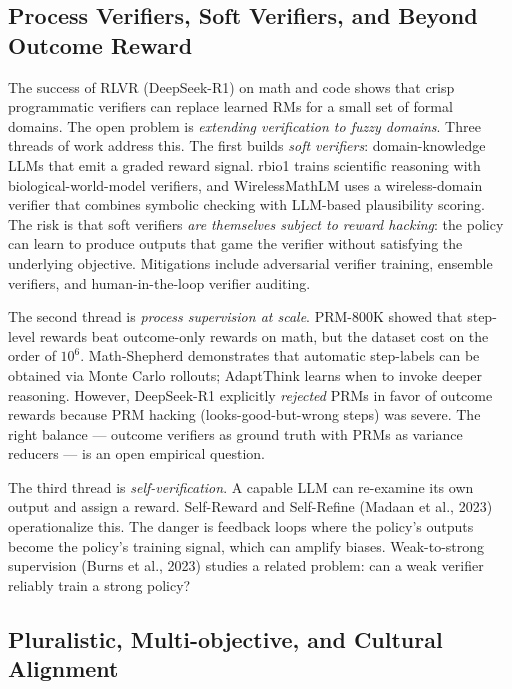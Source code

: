 \documentclass{article}
\begin{document}
\subsection{Process Verifiers, Soft Verifiers, and Beyond Outcome Reward}\label{process-verifiers-soft-verifiers-and-beyond-outcome-reward}

The success of RLVR (DeepSeek-R1) on math and code shows that crisp programmatic verifiers can replace learned RMs for a small set of formal domains. The open problem is \emph{extending verification to fuzzy domains}. Three threads of work address this. The first builds \emph{soft verifiers}: domain-knowledge LLMs that emit a graded reward signal. rbio1 \citep{istrate20252025} trains scientific reasoning with biological-world-model verifiers, and WirelessMathLM \citep{li20252025} uses a wireless-domain verifier that combines symbolic checking with LLM-based plausibility scoring. The risk is that soft verifiers \emph{are themselves subject to reward hacking}: the policy can learn to produce outputs that game the verifier without satisfying the underlying objective. Mitigations include adversarial verifier training, ensemble verifiers, and human-in-the-loop verifier auditing.

The second thread is \emph{process supervision at scale}. PRM-800K \citep{lightman2023letsverifystepbyst} showed that step-level rewards beat outcome-only rewards on math, but the dataset cost on the order of \(10^6\). Math-Shepherd \citep{wang2024interpretableprefe} demonstrates that automatic step-labels can be obtained via Monte Carlo rollouts; AdaptThink \citep{zhang20252025} learns when to invoke deeper reasoning. However, DeepSeek-R1 explicitly \emph{rejected} PRMs in favor of outcome rewards because PRM hacking (looks-good-but-wrong steps) was severe. The right balance --- outcome verifiers as ground truth with PRMs as variance reducers --- is an open empirical question.

The third thread is \emph{self-verification}. A capable LLM can re-examine its own output and assign a reward. Self-Reward \citep{yuan2023rrhfrankresponsest} and Self-Refine (Madaan et al., 2023) operationalize this. The danger is feedback loops where the policy's outputs become the policy's training signal, which can amplify biases. Weak-to-strong supervision (Burns et al., 2023) studies a related problem: can a weak verifier reliably train a strong policy?

\subsection{Pluralistic, Multi-objective, and Cultural Alignment}\label{pluralistic-multi-objective-and-cultural-alignment}
\end{document}
